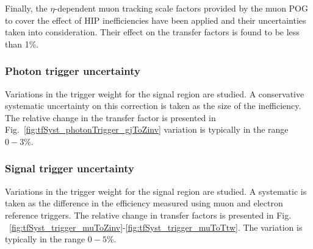 Finally, the $\eta$-dependent muon tracking scale factors provided by the muon 
POG to cover the effect of HIP inefficiencies have been applied and their 
uncertainties taken into consideration. Their effect on the transfer factors
is found to be less than 1\%.

\subsubsection*{Photon trigger uncertainty}
\label{sec:tfSyst_photonTrigger}

Variations in the trigger weight for the signal region are studied. A conservative systematic
uncertainty on this correction is taken as the size of the inefficiency. 
The relative change in the \gj transfer factor is presented in Fig.~\ref{fig:tfSyst_photonTrigger_gjToZinv}
variation is typically in the range $0-3\%$.

\subsubsection*{Signal trigger uncertainty}
\label{sec:tfSyst_trigger}

Variations in the trigger weight for the signal region are studied. A systematic is taken
as the difference in the efficiency measured using muon and electron reference triggers.
The relative change in transfer factors is presented in Fig.
~\ref{fig:tfSyst_trigger_muToZinv}-\ref{fig:tfSyst_trigger_muToTtw}. The
variation is typically in the range $0-5\%$.

%

%

